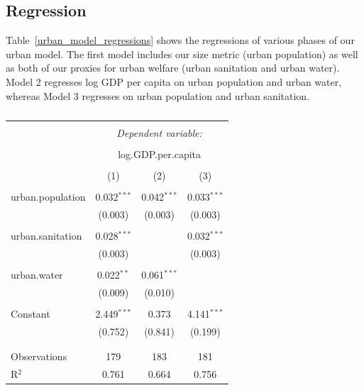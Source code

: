 \documentclass[11pt]{article}
\begin{document}
\subsection{Regression}

Table~\ref{urban_model_regressions} shows the regressions of various phases of our urban model.
The first model includes our size metric (urban population) as well as both of our proxies for urban welfare (urban sanitation and urban water).
Model 2 regresses log GDP per capita on urban population and urban water, whereas Model 3 regresses on urban population and urban sanitation.

\begin{landscape}
\begin{table}[!htbp] \centering 
  \caption{} 
  \label{} 
\begin{tabular}{@{\extracolsep{5pt}}lccc} 
\\[-1.8ex]\hline 
\hline \\[-1.8ex] 
 & \multicolumn{3}{c}{\textit{Dependent variable:}} \\ 
\cline{2-4} 
\\[-1.8ex] & \multicolumn{3}{c}{log.GDP.per.capita} \\ 
\\[-1.8ex] & (1) & (2) & (3)\\ 
\hline \\[-1.8ex] 
 urban.population & 0.032$^{***}$ & 0.042$^{***}$ & 0.033$^{***}$ \\ 
  & (0.003) & (0.003) & (0.003) \\ 
  & & & \\ 
 urban.sanitation & 0.028$^{***}$ &  & 0.032$^{***}$ \\ 
  & (0.003) &  & (0.003) \\ 
  & & & \\ 
 urban.water & 0.022$^{**}$ & 0.061$^{***}$ &  \\ 
  & (0.009) & (0.010) &  \\ 
  & & & \\ 
 Constant & 2.449$^{***}$ & 0.373 & 4.141$^{***}$ \\ 
  & (0.752) & (0.841) & (0.199) \\ 
  & & & \\ 
\hline \\[-1.8ex] 
Observations & 179 & 183 & 181 \\ 
R$^{2}$ & 0.761 & 0.664 & 0.756 \\ 

\end{tabular}
\end{table}
\end{landscape}
\end{document}
